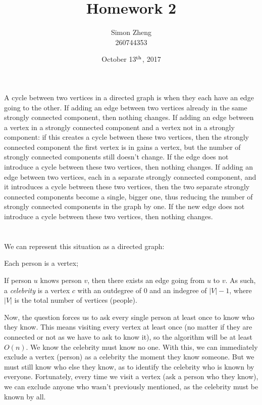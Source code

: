 \documentclass[11pt,letterpaper]{article}
\author{Simon Zheng\\260744353}
\title{Homework 2}
\date{October 13$^{\textnormal{th}}$, 2017}
\begin{document}
	\maketitle
	\thispagestyle{fancy}
	
	\section{}
	A cycle between two vertices in a directed graph is when they each have an edge going to the other.
	If adding an edge between two vertices already in the same strongly connected component, then nothing changes.
	If adding an edge between a vertex in a strongly connected component and a vertex not in a strongly component: if this creates a cycle between these two vertices, then the strongly connected component the first vertex is in gains a vertex, but the number of strongly connected components still doesn't change. If the edge does not introduce a cycle between these two vertices, then nothing changes.
	If adding an edge between two vertices, each in a separate strongly connected component, and it introduces a cycle between these two vertices, then the two separate strongly connected components become a single, bigger one, thus reducing the number of strongly connected components in the graph by one. If the new edge does not introduce a cycle between these two vertices, then nothing changes.
	
	\section{}
	We can represent this situation as a directed graph:
	
	Each person is a vertex;
	
	If person $u$ knows person $v$, then there exists an edge going from $u$ to $v$.\newline
	As such, a \textit{celebrity} is a vertex $c$ with an outdegree of $0$ and an indegree of $|V| - 1$, where $|V|$ is the total number of vertices (people).
	
	Now, the question forces us to ask every single person at least once to know who they know. This means visiting every vertex at least once (no matter if they are connected or not as we have to ask to know it), so the algorithm will be at least $O(n)$.
	We know the celebrity must know no one. With this, we can immediately exclude a vertex (person) as a celebrity the moment they know someone. But we must still know who else they know, as to identify the celebrity who is known by everyone.
	Fortunately, every time we visit a vertex (ask a person who they know), we can exclude anyone who wasn't previously mentioned, as the celebrity must be known by all.
	
\end{document}
